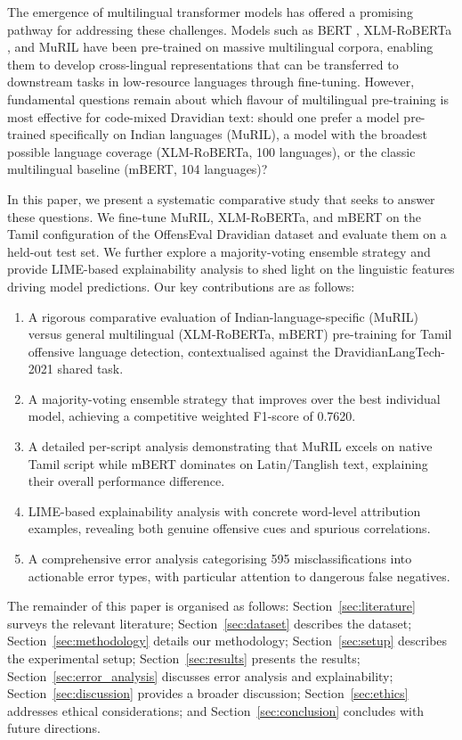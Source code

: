 \documentclass[12pt, a4paper]{article}
\begin{document}
The emergence of multilingual transformer models has offered a promising pathway for addressing these challenges. Models such as BERT \citep{devlin2019bert}, XLM-RoBERTa \citep{conneau2020xlmr}, and MuRIL \citep{khanuja2021muril} have been pre-trained on massive multilingual corpora, enabling them to develop cross-lingual representations that can be transferred to downstream tasks in low-resource languages through fine-tuning. However, fundamental questions remain about which flavour of multilingual pre-training is most effective for code-mixed Dravidian text: should one prefer a model pre-trained specifically on Indian languages (MuRIL), a model with the broadest possible language coverage (XLM-RoBERTa, 100 languages), or the classic multilingual baseline (mBERT, 104 languages)?

In this paper, we present a systematic comparative study that seeks to answer these questions. We fine-tune MuRIL, XLM-RoBERTa, and mBERT on the Tamil configuration of the OffensEval Dravidian dataset and evaluate them on a held-out test set. We further explore a majority-voting ensemble strategy and provide LIME-based explainability analysis to shed light on the linguistic features driving model predictions. Our key contributions are as follows:

\begin{enumerate}[leftmargin=2em]
    \item A rigorous comparative evaluation of Indian-language-specific (MuRIL) versus general multilingual (XLM-RoBERTa, mBERT) pre-training for Tamil offensive language detection, contextualised against the DravidianLangTech-2021 shared task.
    \item A majority-voting ensemble strategy that improves over the best individual model, achieving a competitive weighted F1-score of 0.7620.
    \item A detailed per-script analysis demonstrating that MuRIL excels on native Tamil script while mBERT dominates on Latin/Tanglish text, explaining their overall performance difference.
    \item LIME-based explainability analysis with concrete word-level attribution examples, revealing both genuine offensive cues and spurious correlations.
    \item A comprehensive error analysis categorising 595 misclassifications into actionable error types, with particular attention to dangerous false negatives.
\end{enumerate}

The remainder of this paper is organised as follows: Section~\ref{sec:literature} surveys the relevant literature; Section~\ref{sec:dataset} describes the dataset; Section~\ref{sec:methodology} details our methodology; Section~\ref{sec:setup} describes the experimental setup; Section~\ref{sec:results} presents the results; Section~\ref{sec:error_analysis} discusses error analysis and explainability; Section~\ref{sec:discussion} provides a broader discussion; Section~\ref{sec:ethics} addresses ethical considerations; and Section~\ref{sec:conclusion} concludes with future directions.
\end{document}
